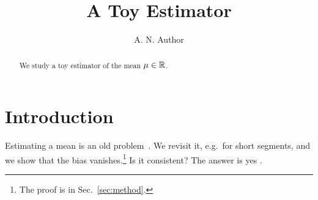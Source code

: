 \documentclass{article}
\title{A Toy Estimator}
\author{A. N. Author}
\begin{document}
\maketitle

\begin{abstract}
We study a toy estimator of the mean $\mu \in \mathbb{R}$.
\end{abstract}

\section{Introduction}
Estimating a mean is an old problem~\cite{gauss1809}. %
We revisit it, e.g.\ for short segments, and we show that the bias vanishes.\footnote{The proof is in Sec.~\ref{sec:method}.}
Is it consistent? The answer is yes \citep{fisher1925,gauss1809}.





\end{document}
